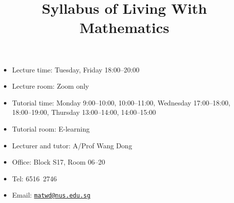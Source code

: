 \documentclass[a4paper]{article}
\title{Syllabus of Living With Mathematics}
\date{}
\begin{document}
\maketitle

\begin{minipage}[t]{0.5\linewidth}
  \begin{itemize}[leftmargin=*]
  \item Lecture time: Tuesday, Friday 18:00--20:00
  \item Lecture room: Zoom only
  \item Tutorial time: Monday 9:00--10:00, 10:00--11:00, Wednesday 17:00--18:00, 18:00--19:00, Thursday 13:00--14:00, 14:00--15:00
  \item Tutorial room: E-learning
  \end{itemize}
\end{minipage}
\begin{minipage}[t]{0.45\linewidth}
  \begin{itemize}
  \item Lecturer and tutor: A/Prof Wang Dong
  \item Office: Block S17, Room 06--20
  \item Tel: 6516\ 2746
  \item Email: \href{mailto:matwd@nus.edu.sg}{\nolinkurl{matwd@nus.edu.sg}}
  \end{itemize}
\end{minipage}
\end{document}
